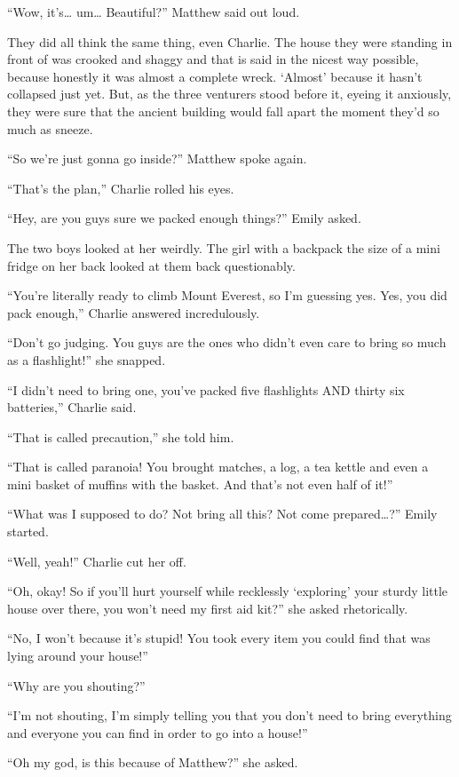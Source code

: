 “Wow, it’s… um… Beautiful?” Matthew said out loud.

They did all think the same thing, even Charlie. The house they were standing in front of was crooked and shaggy and that is said in the nicest way possible, because honestly it was almost a complete wreck. ‘Almost’ because it hasn’t collapsed just yet. But, as the three venturers stood before it, eyeing it anxiously, they were sure that the ancient building would fall apart the moment they’d so much as sneeze.

“So we’re just gonna go inside?” Matthew spoke again.

“That’s the plan,” Charlie rolled his eyes.

“Hey, are you guys sure we packed enough things?” Emily asked.

The two boys looked at her weirdly. The girl with a backpack the size of a mini fridge on her back looked at them back questionably.

“You’re literally ready to climb Mount Everest, so I’m guessing yes. Yes, you did pack enough,” Charlie answered incredulously.

“Don’t go judging. You guys are the ones who didn’t even care to bring so much as a flashlight!” she snapped.

“I didn’t need to bring one, you’ve packed five flashlights AND thirty six batteries,” Charlie said.

“That is called precaution,” she told him.

“That is called paranoia! You brought matches, a log, a tea kettle and even a mini basket of muffins with the basket. And that’s not even half of it!”

“What was I supposed to do? Not bring all this? Not come prepared…?” Emily started.

“Well, yeah!” Charlie cut her off.

“Oh, okay! So if you’ll hurt yourself while recklessly ‘exploring’ your sturdy little house over there, you won’t need my first aid kit?” she asked rhetorically.

“No, I won’t because it’s stupid! You took every item you could find that was lying around your house!”

“Why are you shouting?”

“I’m not shouting, I’m simply telling you that you don’t need to bring everything and everyone you can find in order to go into a house!”

“Oh my god, is this because of Matthew?” she asked.

